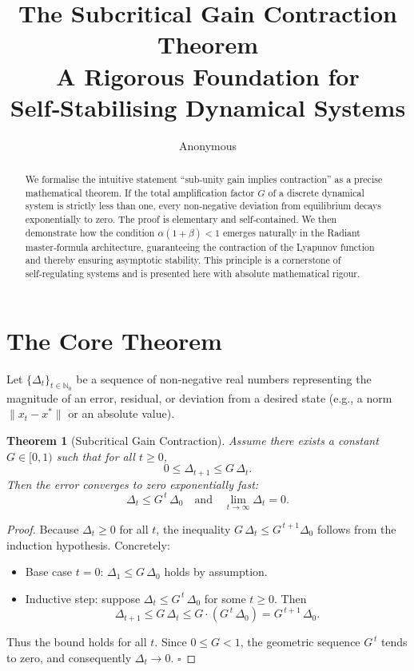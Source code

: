 \documentclass[11pt]{article}
\title{\textbf{The Subcritical Gain Contraction Theorem}\\
A Rigorous Foundation for Self‑Stabilising Dynamical Systems}
\author{Anonymous}
\newtheorem{theorem}{Theorem}[section]
\begin{document}
\maketitle

\begin{abstract}
We formalise the intuitive statement ``sub‑unity gain implies contraction'' as a precise mathematical theorem. If the total amplification factor \(G\) of a discrete dynamical system is strictly less than one, every non‑negative deviation from equilibrium decays exponentially to zero. The proof is elementary and self‑contained. We then demonstrate how the condition \(\alpha(1+\beta) < 1\) emerges naturally in the Radiant master‑formula architecture, guaranteeing the contraction of the Lyapunov function and thereby ensuring asymptotic stability. This principle is a cornerstone of self‑regulating systems and is presented here with absolute mathematical rigour.
\end{abstract}

\section{The Core Theorem}

Let \(\{ \Delta_t \}_{t \in \mathbb{N}_0}\) be a sequence of non‑negative real numbers representing the magnitude of an error, residual, or deviation from a desired state (e.g., a norm \(\|x_t - x^*\|\) or an absolute value).

\begin{theorem}[Subcritical Gain Contraction]\label{thm:contraction}
Assume there exists a constant \(G \in [0,1)\) such that for all \(t \ge 0\),
\begin{equation}\label{eq:bounds}
0 \le \Delta_{t+1} \le G\,\Delta_t .
\end{equation}
Then the error converges to zero exponentially fast:
\begin{equation}
\boxed{\Delta_t \le G^{\,t}\,\Delta_0 \quad \text{and} \quad \lim_{t\to\infty} \Delta_t = 0 .}
\end{equation}
\end{theorem}

\begin{proof}
Because \(\Delta_t \ge 0\) for all \(t\), the inequality \(G\,\Delta_t \le G^{\,t+1}\Delta_0\) follows from the induction hypothesis. Concretely:
\begin{itemize}
\item Base case \(t=0\): \(\Delta_1 \le G\,\Delta_0\) holds by assumption.
\item Inductive step: suppose \(\Delta_t \le G^{\,t}\,\Delta_0\) for some \(t\ge 0\). Then
\[
\Delta_{t+1} \le G\,\Delta_t \le G \cdot (G^{\,t}\,\Delta_0) = G^{\,t+1}\,\Delta_0 .
\]
\end{itemize}
Thus the bound holds for all \(t\). Since \(0 \le G < 1\), the geometric sequence \(G^{\,t}\) tends to zero, and consequently \(\Delta_t \to 0\). \hfill \(\square\)
\end{proof}
\end{document}
